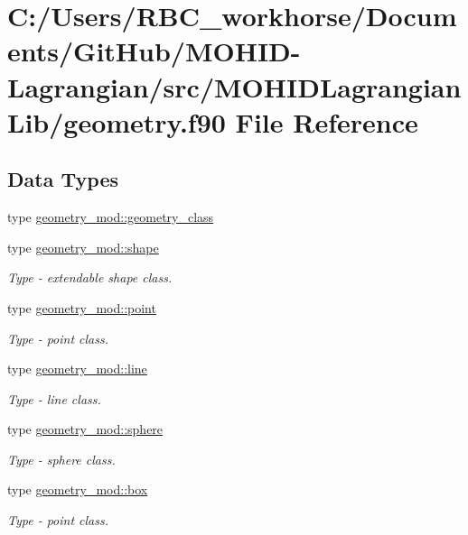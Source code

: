 \hypertarget{geometry_8f90}{}\section{C\+:/\+Users/\+R\+B\+C\+\_\+workhorse/\+Documents/\+Git\+Hub/\+M\+O\+H\+I\+D-\/\+Lagrangian/src/\+M\+O\+H\+I\+D\+Lagrangian\+Lib/geometry.f90 File Reference}
\label{geometry_8f90}
\subsection*{Data Types}
\begin{DoxyCompactItemize}
\item 
type \mbox{\hyperlink{structgeometry__mod_1_1geometry__class}{geometry\+\_\+mod\+::geometry\+\_\+class}}
\item 
type \mbox{\hyperlink{structgeometry__mod_1_1shape}{geometry\+\_\+mod\+::shape}}
\begin{DoxyCompactList}\small\item\em Type -\/ extendable shape class. \end{DoxyCompactList}\item 
type \mbox{\hyperlink{structgeometry__mod_1_1point}{geometry\+\_\+mod\+::point}}
\begin{DoxyCompactList}\small\item\em Type -\/ point class. \end{DoxyCompactList}\item 
type \mbox{\hyperlink{structgeometry__mod_1_1line}{geometry\+\_\+mod\+::line}}
\begin{DoxyCompactList}\small\item\em Type -\/ line class. \end{DoxyCompactList}\item 
type \mbox{\hyperlink{structgeometry__mod_1_1sphere}{geometry\+\_\+mod\+::sphere}}
\begin{DoxyCompactList}\small\item\em Type -\/ sphere class. \end{DoxyCompactList}\item 
type \mbox{\hyperlink{structgeometry__mod_1_1box}{geometry\+\_\+mod\+::box}}
\begin{DoxyCompactList}\small\item\em Type -\/ point class. \end{DoxyCompactList}\end{DoxyCompactItemize}
